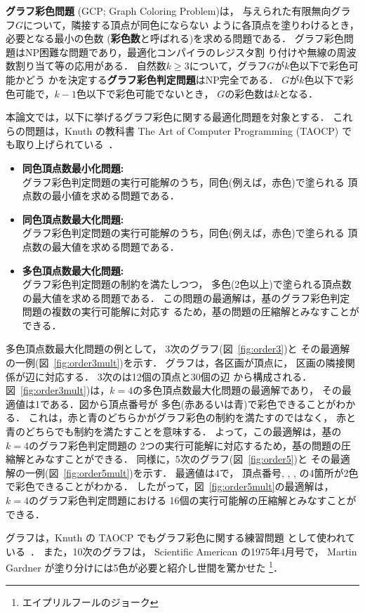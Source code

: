 \textbf{グラフ彩色問題} (GCP; Graph Coloring Problem)は，
与えられた有限無向グラフ$G$について，隣接する頂点が同色にならない
ように各頂点を塗りわけるとき，必要となる最小の色数
(\textbf{彩色数}と呼ばれる)を求める問題である．
グラフ彩色問題はNP困難な問題であり，最適化コンパイラのレジスタ割
り付けや無線の周波数割り当て等の応用がある．
自然数$k\geq 3$について，グラフ$G$が$k$色以下で彩色可能かどう
かを決定する\textbf{グラフ彩色判定問題}はNP完全である．
$G$が$k$色以下で彩色可能で，$k-1$色以下で彩色可能でないとき，
$G$の彩色数は$k$となる．

本論文では，以下に挙げるグラフ彩色に関する最適化問題を対象とする．
これらの問題は，Knuth の教科書 The Art of Computer Programming (TAOCP)
でも取り上げられている~\cite{Knuth:TAOCP:SAT}．

\begin{itemize}
\item \textbf{同色頂点数最小化問題: }\\
  グラフ彩色判定問題の実行可能解のうち，同色(例えば，赤色)で塗られる
  頂点数の最小値を求める問題である．
\item \textbf{同色頂点数最大化問題: }\\
  グラフ彩色判定問題の実行可能解のうち，同色(例えば，赤色)で塗られる
  頂点数の最大値を求める問題である．
\item \textbf{多色頂点数最大化問題: }\\
  グラフ彩色判定問題の制約を満たしつつ，
  多色(2色以上)で塗られる頂点数の最大値を求める問題である．
  この問題の最適解は，基のグラフ彩色判定問題の複数の実行可能解に対応す
  るため，基の問題の圧縮解とみなすことができる．
\end{itemize}

多色頂点数最大化問題の例として，
3次のグラフ(図~\ref{fig:order3})と
その最適解の一例(図~\ref{fig:order3mult})を示す．
グラフは，各区画が頂点に，
区画の隣接関係が辺に対応する．
3次のは12個の頂点と30個の辺
から構成される．
図~\ref{fig:order3mult})は，$k=4$の多色頂点数最大化問題の最適解であり，
その最適値は1である．図から頂点番号が
多色(赤あるいは青)で彩色できることがわかる．
これは，赤と青のどちらかがグラフ彩色の制約を満たすのではなく，
赤と青のどちらでも制約を満たすことを意味する．
よって，この最適解は，基の$k=4$のグラフ彩色判定問題の
2つの実行可能解に対応するため，基の問題の圧縮解とみなすことができる．
%
同様に，5次のグラフ(図~\ref{fig:order5})と
その最適解の一例(図~\ref{fig:order5mult})を示す．
最適値は4で，
頂点番号, , , 
の4箇所が2色で彩色できることがわかる．
したがって，図~\ref{fig:order5mult}の最適解は，
$k=4$のグラフ彩色判定問題における
16個の実行可能解の圧縮解とみなすことができる．

グラフは，Knuth の TAOCP でもグラフ彩色に関する練習問題
として使われている~\cite{Knuth:TAOCP:SAT}．
また，10次のグラフは，
Scientific American の1975年4月号で，
Martin Gardner が塗り分けには5色が必要と紹介し世間を驚かせた
\footnote{エイプリルフールのジョーク}．

